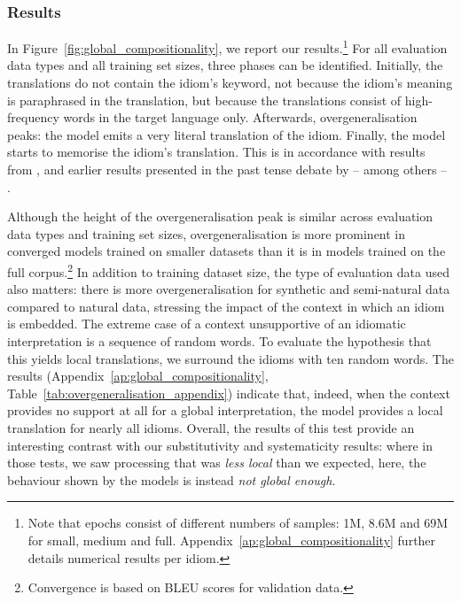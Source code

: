 \subsubsection{Results}
In Figure~\ref{fig:global_compositionality}, we report our results.\footnote{Note that epochs consist of different numbers of samples: 1M, 8.6M and 69M for small, medium and full. Appendix~\ref{ap:global_compositionality} further details numerical results per idiom.}
For all evaluation data types and all training set sizes, three phases can be identified.
Initially, the translations do not contain the idiom's keyword, not because the idiom's meaning is paraphrased in the translation, but because the translations consist of high-frequency words in the target language only. 
Afterwards, overgeneralisation peaks: the model emits a very literal translation of the idiom.
Finally, the model starts to memorise the idiom's translation.
This is in accordance with results from \citet{hupkes2020compositionality}, and earlier results presented in the past tense debate by -- among others -- \citet{rumelhart1986learning}.

Although the height of the overgeneralisation peak is similar across evaluation data types and training set sizes, overgeneralisation is more prominent in converged models trained on smaller datasets than it is in models trained on the full corpus.\footnote{Convergence is based on BLEU scores for validation data.}
In addition to training dataset size, the type of evaluation data used also matters: there is more overgeneralisation for synthetic and semi-natural data compared to natural data, stressing the impact of the context in which an idiom is embedded.
The extreme case of a context unsupportive of an idiomatic interpretation is a sequence of random words. To evaluate the hypothesis that this yields local translations, we surround the idioms with ten random words.
The results (Appendix~\ref{ap:global_compositionality}, Table~\ref{tab:overgeneralisation_appendix}) indicate that, indeed,  when the context provides no support at all for a global interpretation, the model provides a local translation for nearly all idioms.
Overall, the results of this test provide an interesting contrast with our substitutivity and systematicity results: where in those tests, we saw processing that was \emph{less local} than we expected, here, the behaviour shown by the models is instead \emph{not global enough}.